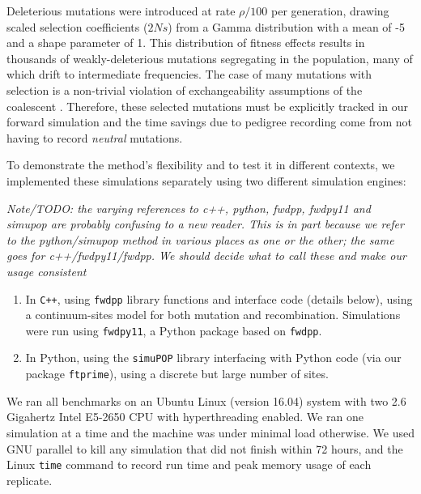 \documentclass{article}
\newcommand{\simupop}{\texttt{simuPOP}}
\newcommand{\fwdpp}{\texttt{fwdpp}}
\newcommand{\fwdpy}{\texttt{fwdpy11}}
\newcommand{\cpp}{\texttt{C++}}
\newcommand{\ftprime}{\texttt{ftprime}}
\newcommand{\jda}[1]{{\em \color{cyan} #1}}
\begin{document}
Deleterious mutations were introduced at rate $\rho/100$ per generation, drawing scaled selection
coefficients ($2Ns$)
from a Gamma distribution with a mean of -5 and a shape parameter of 1.  This distribution of fitness effects results in
thousands of weakly-deleterious mutations segregating in the population, many of which drift to intermediate
frequencies.  The case of many mutations with selection is a non-trivial violation of exchangeability assumptions of the
coalescent \citep{Neuhauser1997-nn}.  Therefore, these selected mutations must be explicitly tracked in our forward simulation
and the time savings due to pedigree recording come from not having to record \textit{neutral} mutations.

To demonstrate the method's flexibility and to test it in different contexts,
we implemented these simulations separately using two different simulation engines:

\jda{Note/TODO: the varying references to c++, python, fwdpp, fwdpy11 and
	simupop are probably confusing to a new reader. This is in part because
	we refer to the python/simupop method in various places as one or the
	other; the same goes for c++/fwdpy11/fwdpp. We should decide what to
	call these and make our usage consistent}

\begin{enumerate}

    \item
        In \cpp{}, using \fwdpp{} library functions and interface code (details below),
        using a continuum-sites model for both mutation and recombination. Simulations were run using \fwdpy{}, a Python
        package based on \fwdpp.

    \item
        In Python, using the \simupop{} library interfacing with Python code
	(via our package \ftprime{}),
        using a discrete but large number of sites.

\end{enumerate}

We ran all benchmarks on an Ubuntu Linux (version 16.04) system with two 2.6 Gigahertz Intel E5-2650 CPU with
hyperthreading enabled.
We ran one simulation at a time and the machine was under minimal load otherwise.
We used GNU parallel \citep{Tange2011a} to kill any simulation that did not finish within 72 hours,
and the Linux \texttt{time} command to record run time and peak memory usage of each replicate.
\end{document}
